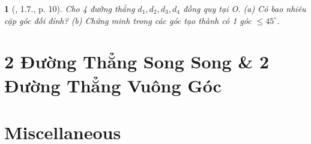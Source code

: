 \documentclass{article}
\newtheorem{baitoan}{}
\begin{document}
\begin{baitoan}[\cite{Hung_Mai_Toan_7_hinh_hoc}, 1.7., p. 10]
	Cho 4 đường thẳng $d_1,d_2,d_3,d_4$ đồng quy tại O. (a) Có bao nhiêu cặp góc đối đỉnh? (b) Chứng minh trong các góc tạo thành có 1 góc $\le45^\circ$.
\end{baitoan}


\section{2 Đường Thẳng Song Song \& 2 Đường Thẳng Vuông Góc}


\section{Miscellaneous}


\printbibliography[heading=bibintoc]
	
\end{document}

